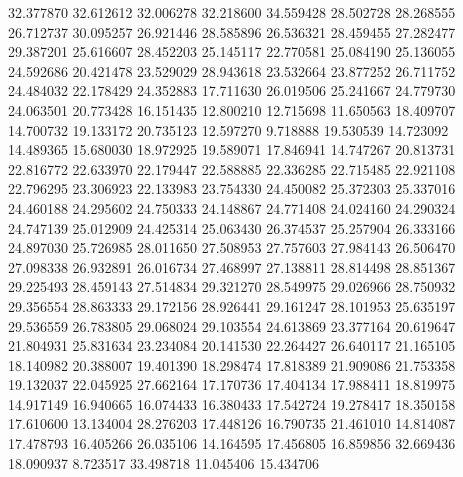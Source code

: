 32.377870
32.612612
32.006278
32.218600
34.559428
28.502728
28.268555
26.712737
30.095257
26.921446
28.585896
26.536321
28.459455
27.282477
29.387201
25.616607
28.452203
25.145117
22.770581
25.084190
25.136055
24.592686
20.421478
23.529029
28.943618
23.532664
23.877252
26.711752
24.484032
22.178429
24.352883
17.711630
26.019506
25.241667
24.779730
24.063501
20.773428
16.151435
12.800210
12.715698
11.650563
18.409707
14.700732
19.133172
20.735123
12.597270
9.718888
19.530539
14.723092
14.489365
15.680030
18.972925
19.589071
17.846941
14.747267
20.813731
22.816772
22.633970
22.179447
22.588885
22.336285
22.715485
22.921108
22.796295
23.306923
22.133983
23.754330
24.450082
25.372303
25.337016
24.460188
24.295602
24.750333
24.148867
24.771408
24.024160
24.290324
24.747139
25.012909
24.425314
25.063430
26.374537
25.257904
26.333166
24.897030
25.726985
28.011650
27.508953
27.757603
27.984143
26.506470
27.098338
26.932891
26.016734
27.468997
27.138811
28.814498
28.851367
29.225493
28.459143
27.514834
29.321270
28.549975
29.026966
28.750932
29.356554
28.863333
29.172156
28.926441
29.161247
28.101953
25.635197
29.536559
26.783805
29.068024
29.103554
24.613869
23.377164
20.619647
21.804931
25.831634
23.234084
20.141530
22.264427
26.640117
21.165105
18.140982
20.388007
19.401390
18.298474
17.818389
21.909086
21.753358
19.132037
22.045925
27.662164
17.170736
17.404134
17.988411
18.819975
14.917149
16.940665
16.074433
16.380433
17.542724
19.278417
18.350158
17.610600
13.134004
28.276203
17.448126
16.790735
21.461010
14.814087
17.478793
16.405266
26.035106
14.164595
17.456805
16.859856
32.669436
18.090937
8.723517
33.498718
11.045406
15.434706
